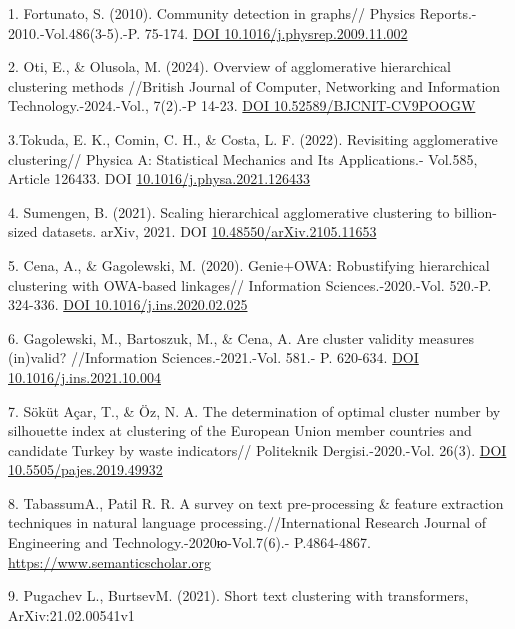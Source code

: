 \begin{references}
1. Fortunato, S. (2010). Community detection in graphs// Physics
Reports.- 2010.-Vol.486(3-5).-P. 75-174.
\href{https://doi.org/10.1016/j.physrep.2009.11.002}{DOI
10.1016/j.physrep.2009.11.002}

2. Oti, E., \& Olusola, M. (2024). Overview of agglomerative
hierarchical clustering methods //British Journal of Computer,
Networking and Information Technology.-2024.-Vol., 7(2).-P 14-23.
\href{https://doi.org/10.52589/BJCNIT-CV9POOGW}{DOI
10.52589/BJCNIT-CV9POOGW}

3.Tokuda, E. K., Comin, C. H., \& Costa, L. F. (2022). Revisiting
agglomerative clustering// Physica A: Statistical Mechanics and Its
Applications.- Vol.585, Article 126433. DOI
\href{https://doi.org/10.1016/j.physa.2021.126433}{10.1016/j.physa.2021.126433}


4. Sumengen, B. (2021). Scaling hierarchical agglomerative clustering to
billion-sized datasets. arXiv, 2021. DOI
\href{https://doi.org/10.48550/arXiv.2105.11653}{10.48550/arXiv.2105.11653}

5. Cena, A., \& Gagolewski, M. (2020). Genie+OWA: Robustifying
hierarchical clustering with OWA-based linkages// Information
Sciences.-2020.-Vol. 520.-P. 324-336.
\href{https://doi.org/10.1016/j.ins.2020.02.025}{DOI
10.1016/j.ins.2020.02.025}


6. Gagolewski, M., Bartoszuk, M., \& Cena, A. Are cluster validity
measures (in)valid? //Information Sciences.-2021.-Vol. 581.- P.
620-634. \href{https://doi.org/10.1016/j.ins.2021.10.004}{DOI
10.1016/j.ins.2021.10.004}

7. Söküt Açar, T., \& Öz, N. A. The determination of optimal cluster
number by silhouette index at clustering of the European Union member
countries and candidate Turkey by waste indicators// Politeknik
Dergisi.-2020.-Vol. 26(3). \href{https://doi.org/10.5505/pajes.2019.49932}{DOI 10.5505/pajes.2019.49932}

8. TabassumA., Patil R. R. A survey on text pre-processing \& feature
extraction techniques in natural language processing.//International
Research Journal of Engineering and Technology.-2020ю-Vol.7(6).-
P.4864-4867. \\\href{https://www.semanticscholar.org/paper/A-Survey-on-Text-Pre-Processing-\%26-Feature-in-Tabassum-Patil/f308488e996599115fe478c03b74a0b19b9a8f06}{https://www.semanticscholar.org}

9. Pugachev L., BurtsevM. (2021). Short text clustering with
transformers, ArXiv:21.02.00541v1


\end{references}
